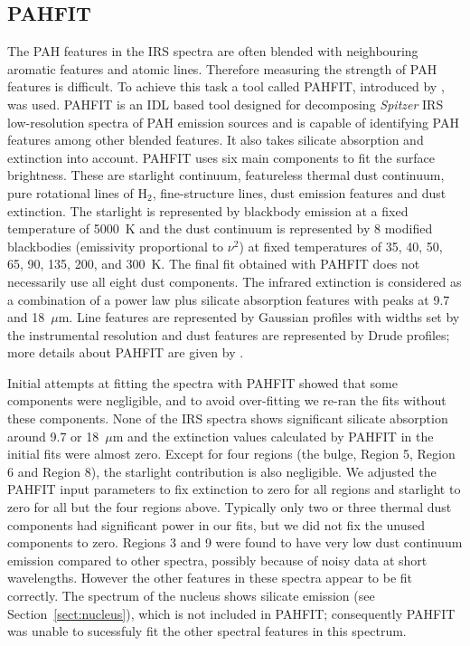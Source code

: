 \subsection{PAHFIT}
\label{sect:pahfit}
The PAH features in the IRS spectra are often blended with neighbouring aromatic features and atomic lines. 
Therefore measuring the strength of PAH features is difficult.  To achieve this task a tool called PAHFIT, introduced by \citet{Smith:2007lr}, was used. 
PAHFIT is an IDL  based tool designed for decomposing {\em Spitzer} IRS low-resolution spectra of PAH emission sources and is capable of identifying PAH features among other blended features. It also takes silicate absorption and extinction into account. 
PAHFIT uses six main components to fit the surface brightness. These are starlight continuum, featureless thermal dust continuum, 
pure rotational lines of H$_2$, fine-structure lines, dust emission features and dust extinction. The starlight is represented by  blackbody 
emission at a fixed temperature of 5000~K and the dust continuum is represented by 8 modified blackbodies (emissivity proportional to $\nu^2$)  
at fixed temperatures of 35, 40, 50, 65, 90, 135, 200, and 300~K. The final fit obtained with PAHFIT does not necessarily use
all eight dust components.
The infrared extinction is considered as a combination of a power law plus silicate absorption features with peaks at 9.7 and 18~$\mu$m. 
Line features are represented by Gaussian profiles with widths set by the instrumental resolution
and dust features are represented by Drude profiles; more details about PAHFIT are given by \citet{Smith:2007lr}.


Initial attempts at fitting the spectra with PAHFIT showed that some components were negligible, and
to avoid over-fitting we re-ran the fits without these components.
None of the IRS spectra shows significant silicate absorption around 9.7 or 18~$\mu$m and the extinction values calculated by PAHFIT 
in the initial fits were almost zero. Except for four regions (the bulge, Region 5, Region 6 and Region 8),
the starlight contribution is also negligible.
We adjusted the PAHFIT input parameters to fix extinction to zero for all regions and starlight to zero for all but the four regions above.
Typically only two or three thermal dust components had significant power in our fits, but we did not fix the unused components to zero.
Regions 3 and 9 were found to have very low dust continuum emission compared to other spectra,
possibly because of noisy data at short wavelengths. However the other features in these spectra appear to
be fit correctly.
The spectrum of the nucleus shows silicate emission (see Section~\ref{sect:nucleus}), which is not included in PAHFIT;  
consequently PAHFIT was unable to sucessfuly fit the other spectral features in this spectrum.

